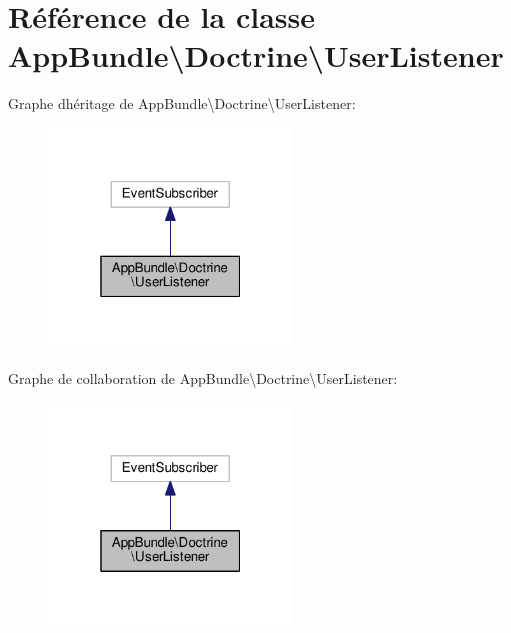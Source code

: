 \hypertarget{classAppBundle_1_1Doctrine_1_1UserListener}{}\section{Référence de la classe App\+Bundle\textbackslash{}Doctrine\textbackslash{}User\+Listener}
\label{classAppBundle_1_1Doctrine_1_1UserListener}


Graphe d\textquotesingle{}héritage de App\+Bundle\textbackslash{}Doctrine\textbackslash{}User\+Listener\+:\nopagebreak
\begin{figure}[H]
\begin{center}
\leavevmode
\includegraphics[width=184pt]{classAppBundle_1_1Doctrine_1_1UserListener__inherit__graph}
\end{center}
\end{figure}


Graphe de collaboration de App\+Bundle\textbackslash{}Doctrine\textbackslash{}User\+Listener\+:\nopagebreak
\begin{figure}[H]
\begin{center}
\leavevmode
\includegraphics[width=184pt]{classAppBundle_1_1Doctrine_1_1UserListener__coll__graph}
\end{center}
\end{figure}
